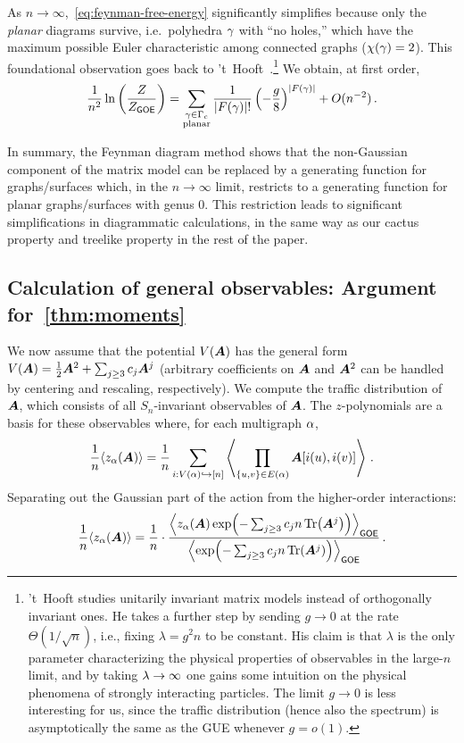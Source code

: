As $n \to \infty$,~\cref{eq:feynman-free-energy} significantly simplifies because only the \emph{planar} diagrams survive, i.e.\ polyhedra $\gamma$ with ``no holes,'' which have the maximum possible Euler characteristic among connected graphs ($\chi(\gamma) = 2$).
This foundational observation goes back to 't~Hooft~\cite{tHooft1974planar}.\footnote{
    't~Hooft studies unitarily invariant matrix models instead of orthogonally
    invariant ones.
    He takes a further step by sending $g\to 0$ at the rate $\Theta(1/\sqrt{n})$, i.e., fixing $\lambda = g^2n$ to be constant. His claim is that $\lambda$ is the only parameter characterizing the physical properties of observables in the large-$n$ limit, and by taking $\lambda \to \infty$ one gains some intuition on the physical phenomena of strongly interacting particles.
    The limit $g \to 0$ is less interesting for us, since the traffic distribution (hence also the spectrum) is asymptotically the same as the GUE whenever $g = o(1)$.
} We obtain, at first order,
\begin{equation}
    \frac{1}{n^2}\ln \left(\frac Z {Z_\textsf{\upshape GOE}}\right) = \sum_{\substack{\gamma \in \Gamma_c\\\text{planar}}} \frac{1}{|F(\gamma)|!}\left(-\frac{g}{8}\right)^{|F(\gamma)|} + O(n^{-2})\,.\label{eq:thooft}
\end{equation}

In summary,
the Feynman diagram method shows that the non-Gaussian component of the matrix model can be replaced by a
generating function for graphs/surfaces which, in the $n\to \infty$ limit,
restricts to a generating function for planar graphs/surfaces with genus 0.
This restriction leads to significant simplifications in diagrammatic calculations,
in the same way as our cactus property and treelike property in the rest of the paper.

\subsection{Calculation of general observables\texorpdfstring{: Argument for~\cref{thm:moments}}{}}

We now assume that the potential $V({\bm A})$ has the general form $V({\bm A})=\frac 12 {\bm A}^2 + \sum_{j\geq 3}c_j{\bm A}^j$ (arbitrary coefficients on ${\bm A}$ and ${\bm A}^2$ can be handled by centering and rescaling, respectively).
We compute the traffic distribution of ${\bm A}$,
which consists of all $S_n$-invariant observables of ${\bm A}$. The $z$-polynomials are a basis for these observables where, for each multigraph $\alpha$,
\begin{equation*}
    \frac 1n\langle z_\alpha({\bm A}) \rangle = \frac 1n \sum_{i : V(\alpha) \hookrightarrow [n]}\left\langle\prod_{\{u,v\} \in E(\alpha)} {\bm A}[i(u), i(v)]\right\rangle\,.
\end{equation*}
Separating out the Gaussian part of the action from the higher-order interactions:
\begin{align*}
    \frac 1n\langle z_\alpha({\bm A}) \rangle = \frac 1n \cdot \frac{\left\langle z_\alpha({\bm A}) \exp(-\sum_{j \geq 3} c_j n \Tr({\bm A}^j)) \right\rangle_\textsf{\upshape GOE}}{\left\langle \exp(-\sum_{j \geq 3} c_j n \Tr({\bm A}^j)) \right\rangle_\textsf{\upshape GOE}}\,.
\end{align*}

